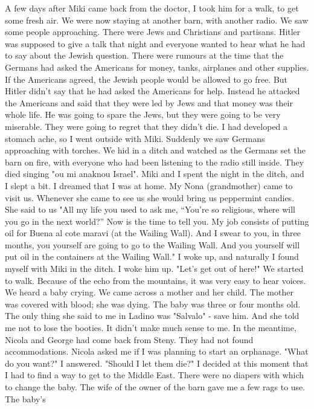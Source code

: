 A few days after Miki came back from the doctor, I took him for a 
walk, to get some fresh air. We were now staying at another barn, with 
another radio. We saw some people approaching. There were Jews and 
Christians and partisans. Hitler was supposed to give a talk that night 
and everyone wanted to hear what he had to say about the Jewish question. 
There were rumours at the time that the Germans had asked the Americans 
for money, tanks, airplanes and other supplies. If the Americans agreed, 
the Jewish people would be allowed to go free. But Hitler didn't say 
that he had asked the Americans for help. Instead he attacked the Americans and said that they were led by Jews and that money was their 
whole life. He was going to spare the Jews, but they were going to be very miserable. They were going to regret that they didn't die. 
I had developed a stomach ache, so I went outside with Miki. Suddenly we saw Germans approaching with torches. We hid in a ditch and watched as the Germans set the barn on fire, with everyone who had been listening to the radio still inside. They died singing "ou mi anaknou Israel". 
Miki and I spent the night in the ditch, and I slept a bit. I 
dreamed that I was at home. My Nona (grandmother) came to visit us. 
Whenever she came to see us she would bring us peppermint candies. She 
said to us "All my life you used to ask me, “You're so religious, where 
will you go in the next world?” Now is the time to tell you. My job 
consists of putting oil for Buena al cote maravi (at the Wailing Wall). 
And I swear to you, in three months, you yourself are going to go to 
the Wailing Wall. And you yourself will put oil in the containers at the Wailing Wall." I woke up, and naturally I found myself with Miki in the 
ditch. I woke him up. "Let's get out of here!" 
We started to walk. Because of the echo from the mountains, it was very easy to hear voices. We heard a baby crying. We came across a 
mother and her child. The mother was covered with blood; she was dying. 
The baby was three or four months old. The only thing she said to me in 
Ladino was "Salvalo" - save him. And she told me not to lose the booties. 
It didn't make much sense to me. 
In the meantime, Nicola and George had come back from Steny. They 
had not found accommodations. Nicola asked me if I was planning to start 
an orphanage. "What do you want?" I answered. "Should I let them die?" 
 I decided at this moment that I had to find a way to get to the Middle East. 
There were no diapers with which to change the baby. The wife of 
the owner of the barn gave me a few rags to use. The baby's 
